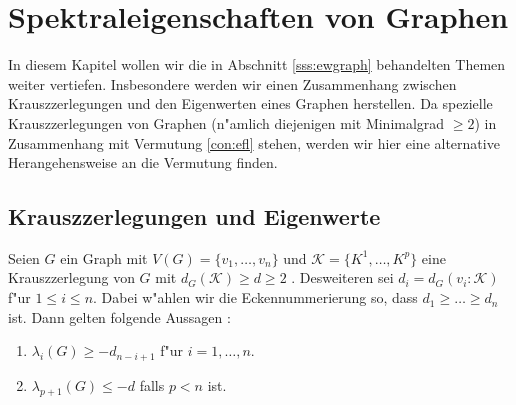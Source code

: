 \section{Spektraleigenschaften von Graphen}

In diesem Kapitel wollen wir die in Abschnitt \ref{sss:ewgraph} behandelten Themen weiter vertiefen. Insbesondere werden wir einen Zusammenhang zwischen Krauszzerlegungen und den Eigenwerten eines Graphen herstellen. Da spezielle Krauszzerlegungen von Graphen (n"amlich diejenigen mit Minimalgrad $\geq 2$) in Zusammenhang mit Vermutung \ref{con:efl} stehen, werden wir hier eine alternative Herangehensweise an die Vermutung finden. 

\subsection{Krauszzerlegungen und Eigenwerte}
\begin{theorem}
  \label{thm:KrauszEigenwerte}
  Seien $G$ ein Graph mit $V(G)=\{v_1,\dots,v_n\}$ und $\mathcal K=\{K^1,\dots,K^p\}$ eine Krauszzerlegung von $G$ mit $d_G(\mathcal K) \geq d \geq 2$ . Desweiteren sei $d_i = d_G(v_{i}:\mathcal K)$ f"ur $1\leq i \leq n$. 
  Dabei w"ahlen wir die Eckennummerierung so, dass $d_1 \geq \dots \geq d_{n}$ ist.
  Dann gelten folgende Aussagen : 
  \begin{enumerate}[label=\rm{(\alph*)}]
    \item $\lambda_i(G) \geq -d_{n-i+1}$ f"ur $i = 1, \dots , n$.
    \item $\lambda_{p+1}(G) \leq -d$ falls $p < n$ ist.
  \end{enumerate}
\end{theorem}
